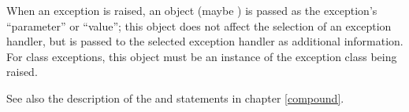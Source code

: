 When an exception is raised, an object (maybe ) is passed
as the exception's ``parameter'' or ``value''; this object does not
affect the selection of an exception handler, but is passed to the
selected exception handler as additional information.  For class
exceptions, this object must be an instance of the exception class
being raised.

See also the description of the  and 
statements in chapter \ref{compound}.
